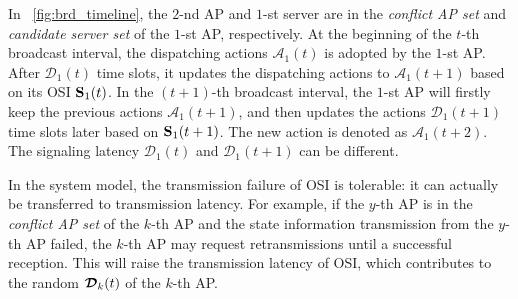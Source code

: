 \begin{example}
    In \figurename~\ref{fig:brd_timeline}, the $2$-nd AP and $1$-st server are in the \emph{conflict AP set} and \emph{candidate server set} of the $1$-st AP, respectively.
    At the beginning of the $t$-th broadcast interval, the dispatching actions $\mathcal{A}_{1}(t)$ is adopted by the $1$-st AP.
    After $\mathcal{D}_{1}(t)$ time slots, it updates the dispatching actions to $\mathcal{A}_{1}(t+1)$ based on its OSI $\mathbf{S}_{1}(t)$.
    In the $(t+1)$-th broadcast interval, the $1$-st AP will firstly keep the previous actions $\mathcal{A}_{1}(t+1)$, and then updates the actions $\mathcal{D}_{1}(t+1)$ time slots later based on $\mathbf{S}_{1}(t+1)$. The new action is denoted as $\mathcal{A}_{1}(t+2)$.
    The signaling latency $\mathcal{D}_1(t)$ and $\mathcal{D}_1(t+1)$ can be different.
\end{example}

\begin{remark}
    In the system model, the transmission failure of OSI is tolerable: it can actually be transferred to transmission latency.
    For example, if the $y$-th AP is in the \emph{conflict AP set} of the $k$-th AP and the state information transmission from the $y$-th AP failed, the $k$-th AP may request retransmissions until a successful reception.
    This will raise the transmission latency of OSI, which contributes to the random {\brlatency} $\boldsymbol{\mathcal{D}}_{k}(t)$ of the $k$-th AP.
\end{remark}

